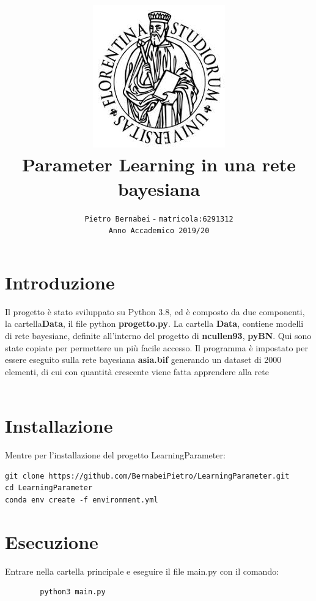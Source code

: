 \documentclass[14pt]{extarticle}
\begin{document}
\title{\includegraphics{download.jpeg} \vspace{2cm} \textbf{\\Parameter Learning in una rete bayesiana}}

\author{\texttt{Pietro Bernabei} - \texttt{matricola:6291312}\\ \texttt{Anno Accademico 2019/20}}
\date{}
\maketitle

\newpage
\section{Introduzione}
	Il progetto è stato sviluppato su Python 3.8, ed è composto da due componenti, la cartella\textbf{Data}, il file python \textbf{progetto.py}.
	La cartella \textbf{Data}, contiene modelli di rete bayesiane, definite all'interno del progetto di \textbf{ncullen93}, 	\textbf{pyBN}. Qui sono state copiate per permettere un più facile accesso.
	Il programma è impostato per essere eseguito sulla rete bayesiana \textbf{asia.bif} generando un dataset di 2000 elementi, di cui con quantità crescente viene fatta apprendere alla rete\\\\
	\section{Installazione}	
Mentre per l'installazione del progetto LearningParameter:
\begin{lstlisting}
git clone https://github.com/BernabeiPietro/LearningParameter.git
cd LearningParameter
conda env create -f environment.yml
\end{lstlisting}

	\section{Esecuzione}
		Entrare nella cartella principale e eseguire il file main.py con il comando:
		\begin{lstlisting}
		python3 main.py
		\end{lstlisting}
		
\end{document}
